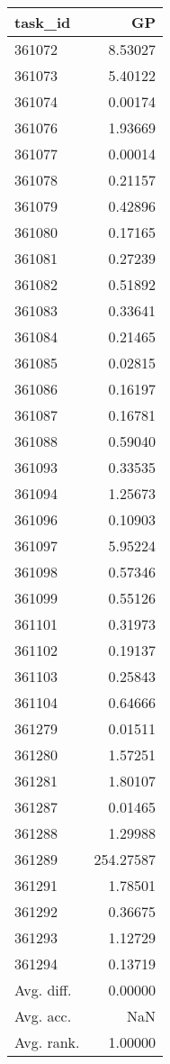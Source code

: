 \begin{tabular}{lr}
\toprule
task\_id & GP \\
\midrule
361072 & 8.53027 \\
361073 & 5.40122 \\
361074 & 0.00174 \\
361076 & 1.93669 \\
361077 & 0.00014 \\
361078 & 0.21157 \\
361079 & 0.42896 \\
361080 & 0.17165 \\
361081 & 0.27239 \\
361082 & 0.51892 \\
361083 & 0.33641 \\
361084 & 0.21465 \\
361085 & 0.02815 \\
361086 & 0.16197 \\
361087 & 0.16781 \\
361088 & 0.59040 \\
361093 & 0.33535 \\
361094 & 1.25673 \\
361096 & 0.10903 \\
361097 & 5.95224 \\
361098 & 0.57346 \\
361099 & 0.55126 \\
361101 & 0.31973 \\
361102 & 0.19137 \\
361103 & 0.25843 \\
361104 & 0.64666 \\
361279 & 0.01511 \\
361280 & 1.57251 \\
361281 & 1.80107 \\
361287 & 0.01465 \\
361288 & 1.29988 \\
361289 & 254.27587 \\
361291 & 1.78501 \\
361292 & 0.36675 \\
361293 & 1.12729 \\
361294 & 0.13719 \\
Avg. diff. & 0.00000 \\
Avg. acc. & NaN \\
Avg. rank. & 1.00000 \\
\bottomrule
\end{tabular}
